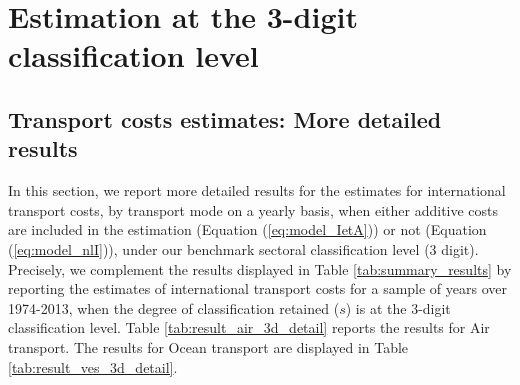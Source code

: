 \documentclass[a4paper,11pt]{article}
\begin{document}
\section{Estimation at the 3-digit classification level \label{app:more_results}}

\subsection{Transport costs estimates: More detailed results}

In this section, we report more detailed results for the estimates for international transport costs, by transport mode on a yearly basis, when either additive costs are included in the estimation (Equation (\ref{eq:model_IetA})) or not (Equation (\ref{eq:model_nlI})), under our benchmark sectoral classification level (3 digit). Precisely, we complement the results displayed in Table \ref{tab:summary_results} by reporting the estimates of international transport costs for a sample of years over 1974-2013, when the degree of classification retained ($s$) is at the 3-digit classification level. Table \ref{tab:result_air_3d_detail} reports the results for Air transport. The results for Ocean transport are displayed in Table \ref{tab:result_ves_3d_detail}.
\end{document}
